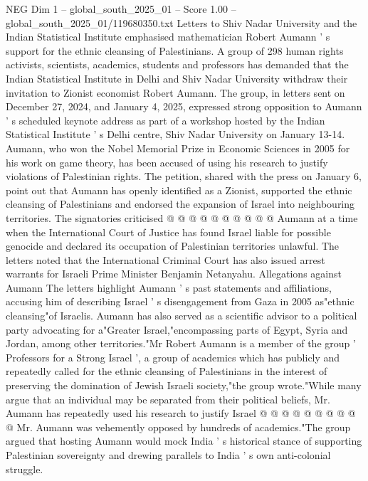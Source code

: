 \begin{textsample}{NEG Dim 1 – global\_south\_2025\_01 – Score 1.00 – global\_south\_2025\_01/119680350.txt}  \label{ex:f1_neg_154}
Letters to Shiv Nadar University and the Indian Statistical Institute emphasised mathematician Robert Aumann ' s support for the ethnic cleansing of Palestinians.
A group of 298 human rights activists, scientists, academics, students and professors has demanded that the Indian Statistical Institute in Delhi and Shiv Nadar University withdraw their invitation to Zionist economist Robert Aumann.
The group, in letters sent on December 27, 2024, and January 4, 2025, expressed strong opposition to Aumann ' s scheduled keynote address as part of a workshop hosted by the Indian Statistical Institute ' s Delhi centre, Shiv Nadar University on January 13-14.
Aumann, who won the Nobel Memorial Prize in Economic Sciences in 2005 for his work on game theory, has been accused of using his research to justify violations of Palestinian rights.
The petition, shared with the press on January 6, point out that Aumann has openly identified as a Zionist, supported the ethnic cleansing of Palestinians and endorsed the expansion of Israel into neighbouring territories.
The signatories criticised @ @ @ @ @ @ @ @ @ @ Aumann at a time when the International Court of Justice has found Israel liable for possible genocide and declared its occupation of Palestinian territories unlawful.
The letters noted that the International Criminal Court has also issued arrest warrants for Israeli Prime Minister Benjamin Netanyahu.
Allegations against Aumann The letters highlight Aumann ' s past statements and affiliations, accusing him of describing Israel ' s disengagement from Gaza in 2005 as"ethnic cleansing"of Israelis.
Aumann has also served as a scientific advisor to a political party advocating for a"Greater Israel,"encompassing parts of Egypt, Syria and Jordan, among other territories."Mr Robert Aumann is a member of the group ' Professors for a Strong Israel ', a group of academics which has publicly and repeatedly called for the ethnic cleansing of Palestinians in the interest of preserving the domination of Jewish Israeli society,"the group wrote."While many argue that an individual may be separated from their political beliefs, Mr.
Aumann has repeatedly used his research to justify Israel @ @ @ @ @ @ @ @ @ @ Mr.
Aumann was vehemently opposed by hundreds of academics."The group argued that hosting Aumann would mock India ' s historical stance of supporting Palestinian sovereignty and drewing parallels to India ' s own anti-colonial struggle.

\end{textsample}
